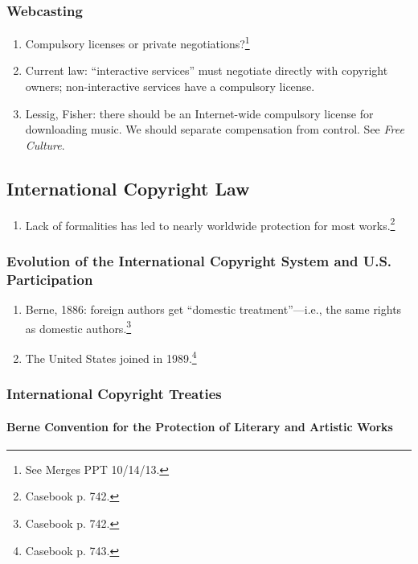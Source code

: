 \subsubsection{Webcasting}

\begin{enumerate}
    \item Compulsory licenses or private negotiations?\footnote{See Merges PPT 
    10/14/13.}
    \item Current law: ``interactive services'' must negotiate directly with 
    copyright owners; non-interactive services have a compulsory license.
    \item Lessig, Fisher: there should be an Internet-wide compulsory license 
    for downloading music. We should separate compensation from control. See 
    \emph{Free Culture}.
\end{enumerate}

\subsection{International Copyright Law}

\begin{enumerate}
    \item Lack of formalities has led to nearly worldwide protection for most 
    works.\footnote{Casebook p. 742.}
\end{enumerate}

\subsubsection{Evolution of the International Copyright System and U.S. 
Participation}

\begin{enumerate}
    \item Berne, 1886: foreign authors get ``domestic treatment''---i.e., the 
    same rights as domestic authors.\footnote{Casebook p. 742.}
    \item The United States joined in 1989.\footnote{Casebook p. 743.}
\end{enumerate}

\subsubsection{International Copyright Treaties}

\paragraph{Berne Convention for the Protection of Literary and Artistic Works}

